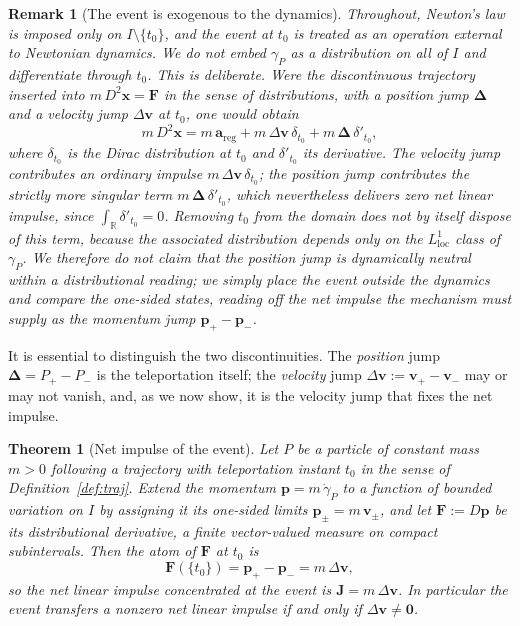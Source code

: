 \documentclass[11pt]{article}
\newtheorem{theorem}[definition]{Theorem}
\newtheorem{remark}[definition]{Remark}
\begin{document}
	\begin{remark}[The event is exogenous to the dynamics]
		\label{rem:exogenous}
		Throughout, Newton's law is imposed only on $I\setminus\{t_0\}$,
		and the event at $t_0$ is treated as an operation external to
		Newtonian dynamics. We do \emph{not} embed $\gamma_P$ as a
		distribution on all of $I$ and differentiate through $t_0$. This is
		deliberate. Were the discontinuous trajectory inserted into
		$m\,D^{2}\mathbf x=\mathbf F$ in the sense of distributions, with a
		position jump $\boldsymbol\Delta$ and a velocity jump
		$\Delta\mathbf v$ at $t_0$, one would obtain
		\[
		m\,D^{2}\mathbf x
		=m\,\mathbf a_{\mathrm{reg}}
		+m\,\Delta\mathbf v\,\delta_{t_0}
		+m\,\boldsymbol\Delta\,\delta'_{t_0},
		\]
		where $\delta_{t_0}$ is the Dirac distribution at $t_0$ and
		$\delta'_{t_0}$ its derivative. The velocity jump contributes an
		ordinary impulse $m\,\Delta\mathbf v\,\delta_{t_0}$; the position
		jump contributes the strictly more singular term
		$m\,\boldsymbol\Delta\,\delta'_{t_0}$, which nevertheless delivers
		\emph{zero} net linear impulse, since $\int_{\mathbb R}\delta'_{t_0}
		=0$. Removing $t_0$ from the domain does not by itself dispose of
		this term, because the associated distribution depends only on the
		$L^{1}_{\mathrm{loc}}$ class of $\gamma_P$. We therefore do not
		claim that the position jump is dynamically neutral within a
		distributional reading; we simply place the event outside the
		dynamics and compare the one-sided states, reading off the net
		impulse the mechanism must supply as the momentum jump
		$\mathbf p_{+}-\mathbf p_{-}$.
	\end{remark}
	
	It is essential to distinguish the two discontinuities. The
	\emph{position} jump $\boldsymbol\Delta=P_{+}-P_{-}$ is the
	teleportation itself; the \emph{velocity} jump
	$\Delta\mathbf v:=\mathbf v_{+}-\mathbf v_{-}$ may or may not vanish,
	and, as we now show, it is the velocity jump that fixes the net
	impulse.
	
	\begin{theorem}[Net impulse of the event]
		\label{thm:impulse}
		Let $P$ be a particle of constant mass $m>0$ following a trajectory
		with teleportation instant $t_0$ in the sense of
		Definition~\ref{def:traj}. Extend the momentum
		$\mathbf p=m\,\dot\gamma_P$ to a function of bounded variation on
		$I$ by assigning it its one-sided limits $\mathbf p_{\pm}=m\,
		\mathbf v_{\pm}$, and let $\mathbf F:=D\mathbf p$ be its
		distributional derivative, a finite vector-valued measure on
		compact subintervals. Then the atom of $\mathbf F$ at $t_0$ is
		\[
		\mathbf F(\{t_0\})=\mathbf p_{+}-\mathbf p_{-}=m\,\Delta\mathbf v,
		\]
		so the net linear impulse concentrated at the event is
		$\mathbf J=m\,\Delta\mathbf v$. In particular the event transfers a
		nonzero net linear impulse if and only if $\Delta\mathbf v\neq
		\mathbf 0$.
	\end{theorem}
	
\end{document}
